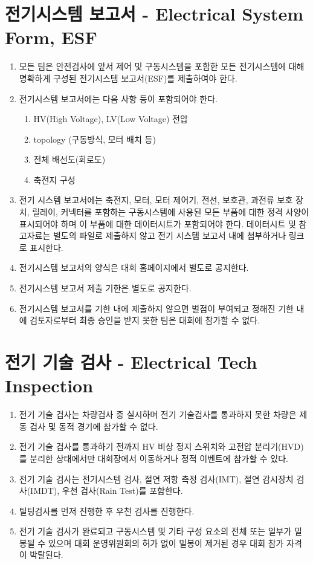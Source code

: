 \documentclass[final,a4paper,10pt]{report}
\begin{document}
\section{전기시스템 보고서 - Electrical System Form, ESF}
\begin{enumerate}
  \item 모든 팀은 안전검사에 앞서 제어 및 구동시스템을 포함한 모든 전기시스템에 대해 명확하게 구성된 전기시스템 보고서(ESF)를 제출하여야 한다.
  
  \item 전기시스템 보고서에는 다음 사항 등이 포함되어야 한다.
    \begin{enumerate}
      \item HV(High Voltage), LV(Low Voltage) 전압
      \item topology (구동방식, 모터 배치 등)
      \item 전체 배선도(회로도)
      \item 축전지 구성
    \end{enumerate}
    
  \item 전기 시스템 보고서에는 축전지, 모터, 모터 제어기, 전선, 보호관, 과전류 보호 장치, 릴레이, 커넥터를 포함하는 구동시스템에 사용된 모든 부품에 대한 정격 사양이 표시되어야 하며 이 부품에 대한 데이터시트가 포함되어야 한다. 데이터시트 및 참고자료는 별도의 파일로 제출하지 않고 전기 시스템 보고서 내에 첨부하거나 링크로 표시한다.
  \item 전기시스템 보고서의 양식은 대회 홈페이지에서 별도로 공지한다.
  \item 전기시스템 보고서 제출 기한은 별도로 공지한다.
  \item 전기시스템 보고서를 기한 내에 제출하지 않으면 벌점이 부여되고 정해진 기한 내에 검토자로부터 최종 승인을 받지 못한 팀은 대회에 참가할 수 없다.
\end{enumerate}

\section{전기 기술 검사 - Electrical Tech Inspection}
\begin{enumerate}
  \item 전기 기술 검사는 차량검사 중 실시하며 전기 기술검사를 통과하지 못한 차량은 제동 검사 및 동적 경기에 참가할 수 없다.
  \item 전기 기술 검사를 통과하기 전까지 HV 비상 정지 스위치와 고전압 분리기(HVD)를 분리한 상태에서만 대회장에서 이동하거나 정적 이벤트에 참가할 수 있다.
  \item 전기 기술 검사는 전기시스템 검사, 절연 저항 측정 검사(IMT), 절연 감시장치 검사(IMDT), 우천 검사(Rain Test)를 포함한다.
  \item 틸팅검사를 먼저 진행한 후 우천 검사를 진행한다.
  \item 전기 기술 검사가 완료되고 구동시스템 및 기타 구성 요소의 전체 또는 일부가 밀봉될 수 있으며 대회 운영위원회의 허가 없이 밀봉이 제거된 경우 대회 참가 자격이 박탈된다.
\end{enumerate}
\end{document}
